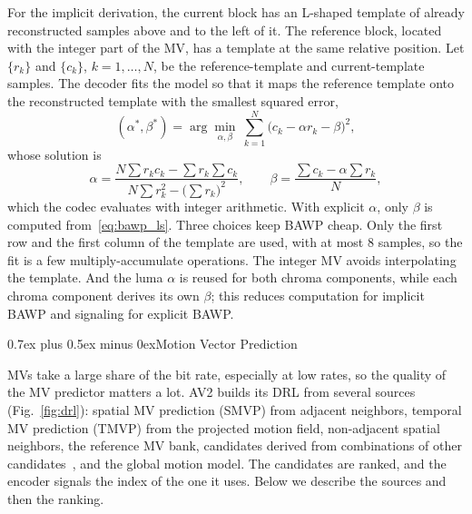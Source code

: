 \documentclass[journal]{IEEEtran}
\makeatletter
\def\section{\@startsection{section}{1}{\z@}{2.5ex plus 1ex minus 1ex}%
{0.7ex plus 0.5ex minus 0ex}{\normalfont\normalsize\centering\scshape}}%
\makeatother
\begin{document}
For the implicit derivation, the current block has an L-shaped template of
already reconstructed samples above and to the left of it. The reference
block, located with the integer part of the MV, has a template at the same
relative position. Let $\{r_k\}$ and $\{c_k\}$, $k=1,\ldots,N$, be the
reference-template and current-template samples. The decoder fits the model
so that it maps the reference template onto the reconstructed template with
the smallest squared error,
\begin{equation}
  (\alpha^{*},\beta^{*}) = \arg\min_{\alpha,\beta}\ \sum_{k=1}^{N}\big(c_k - \alpha r_k - \beta\big)^2 ,
\end{equation}
whose solution is
\begin{equation}
  \alpha = \frac{N\sum r_k c_k - \sum r_k \sum c_k}{N\sum r_k^2 - \big(\sum r_k\big)^2},
  \qquad
  \beta = \frac{\sum c_k - \alpha\sum r_k}{N},
  \label{eq:bawp_ls}
\end{equation}
which the codec evaluates with integer arithmetic. With explicit $\alpha$,
only $\beta$ is computed from~\eqref{eq:bawp_ls}. Three choices keep BAWP
cheap. Only the first row and the first column of the template are used,
with at most 8 samples, so the fit is a few multiply-accumulate operations.
The integer MV avoids interpolating the template. And the luma $\alpha$ is
reused for both chroma components, while each chroma component derives its
own $\beta$; this reduces computation for implicit BAWP and signaling for
explicit BAWP.

\section{Motion Vector Prediction}
\label{sec:mvpred}

MVs take a large share of the bit rate, especially at low rates, so the
quality of the MV predictor matters a lot. AV2 builds its DRL from several
sources (Fig.~\ref{fig:drl}): spatial MV prediction (SMVP) from adjacent
neighbors, temporal MV prediction (TMVP) from the projected motion field, non-adjacent spatial
neighbors, the reference MV bank, candidates derived from combinations of
other candidates~\cite{cwgB049}, and the global motion model. The candidates are ranked, and
the encoder signals the index of the one it uses. Below we describe the
sources and then the ranking.
\end{document}
